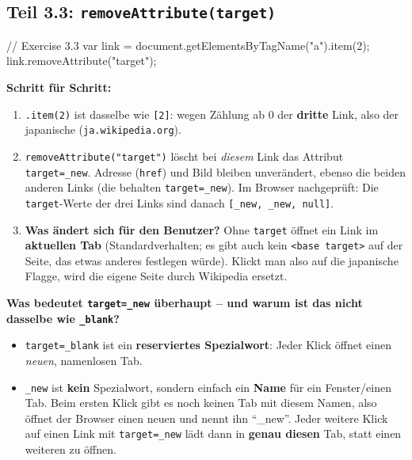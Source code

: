 \documentclass[a4paper,11pt]{article}
\begin{document}
\subsection{Teil 3.3: \texttt{removeAttribute(\textquotedbl{}target\textquotedbl{})}}

\begin{code}[firstnumber=20]
// Exercise 3.3
var link = document.getElementsByTagName("a").item(2);
link.removeAttribute("target");
\end{code}

\textbf{Schritt für Schritt:}
\begin{enumerate}
\item \lstinline|.item(2)| ist dasselbe wie \lstinline|[2]|: wegen Zählung ab 0 der \textbf{dritte} Link, also der
      japanische (\texttt{ja.wikipedia.org}).
\item \lstinline|removeAttribute("target")| löscht bei \emph{diesem} Link das Attribut \texttt{target=\textquotedbl{}\_new\textquotedbl{}}.
      Adresse (\texttt{href}) und Bild bleiben unverändert, ebenso die beiden anderen Links (die behalten
      \texttt{target=\textquotedbl{}\_new\textquotedbl{}}). Im Browser nachgeprüft: Die \texttt{target}-Werte der drei Links sind danach
      \texttt{[\textquotedbl{}\_new\textquotedbl{}, \textquotedbl{}\_new\textquotedbl{}, null]}.
\item \textbf{Was ändert sich für den Benutzer?} Ohne \texttt{target} öffnet ein Link im \textbf{aktuellen Tab}
      (Standardverhalten; es gibt auch kein \texttt{<base target>} auf der Seite, das etwas anderes festlegen würde).
      Klickt man also auf die japanische Flagge, wird die eigene Seite durch Wikipedia ersetzt.
\end{enumerate}

\textbf{Was bedeutet \texttt{target=\textquotedbl{}\_new\textquotedbl{}} überhaupt -- und warum ist das nicht dasselbe wie \texttt{\_blank}?}
\begin{itemize}
\item \texttt{target=\textquotedbl{}\_blank\textquotedbl{}} ist ein \textbf{reserviertes Spezialwort}: Jeder Klick öffnet einen \emph{neuen},
      namenlosen Tab.
\item \texttt{\_new} ist \textbf{kein} Spezialwort, sondern einfach ein \textbf{Name} für ein Fenster/einen Tab.
      Beim ersten Klick gibt es noch keinen Tab mit diesem Namen, also öffnet der Browser einen neuen und nennt ihn
      "`\_new"'. Jeder weitere Klick auf einen Link mit \texttt{target=\textquotedbl{}\_new\textquotedbl{}} lädt dann in \textbf{genau diesen}
      Tab, statt einen weiteren zu öffnen.
\end{itemize}
\end{document}
